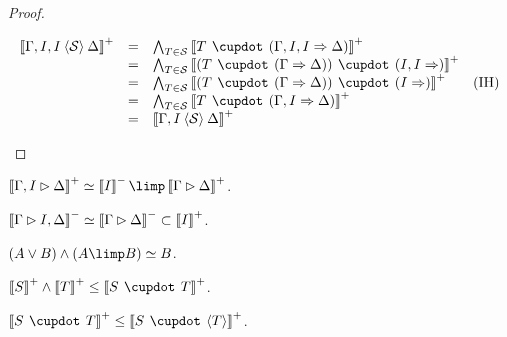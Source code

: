 \begin{proof}
\begin{itemize}
$$    \begin{array}{rcll}
      \psint{\Gamma, I, I \piq{\mathcal{S}} \Delta}
      &=& \bigwedge_{T \in \mathcal{S}}{\psint{T \mix (\Gamma, I, I \seq \Delta)}} & \\
      &=& \bigwedge_{T \in \mathcal{S}}{\psint{(T \mix (\Gamma \seq \Delta)) \mix (I, I \seq)}} & \\
      &=& \bigwedge_{T \in \mathcal{S}}{\psint{(T \mix (\Gamma \seq \Delta)) \mix (I \seq)}} &\text{(IH)} \\
      &=& \bigwedge_{T \in \mathcal{S}}{\psint{T \mix (\Gamma, I \seq \Delta)}} & \\
      &=& \psint{\Gamma, I \piq{\mathcal{S}} \Delta} & \\
    \end{array}
    $$
  \end{itemize}
\end{proof}

\begin{lemma}[Currying]
  $\psint{\Gamma, I \J \Delta} \semequiv \nsint{I} \limp \psint{\Gamma \J
  \Delta}$.
\end{lemma}

\begin{lemma}[Co-currying]
  $\left\llbracket \Gamma \mathbin{\rhd} I, \Delta \right\rrbracket^- \simeq \left\llbracket \Gamma \mathbin{\rhd} \Delta \right\rrbracket^- \subset
  \left\llbracket I \right\rrbracket^+$.
\end{lemma}

\begin{lemma}
  $(A \lor B) \land (A \limp B) \semequiv B$.
\end{lemma}

\begin{lemma}[Mix]
  $\psint{S} \land \psint{T} \sement \psint{S \mix T}$.
\end{lemma}

\begin{lemma}
  $\psint{S \mix T} \sement \psint{S \mix \piq{T}}$.
\end{lemma}

